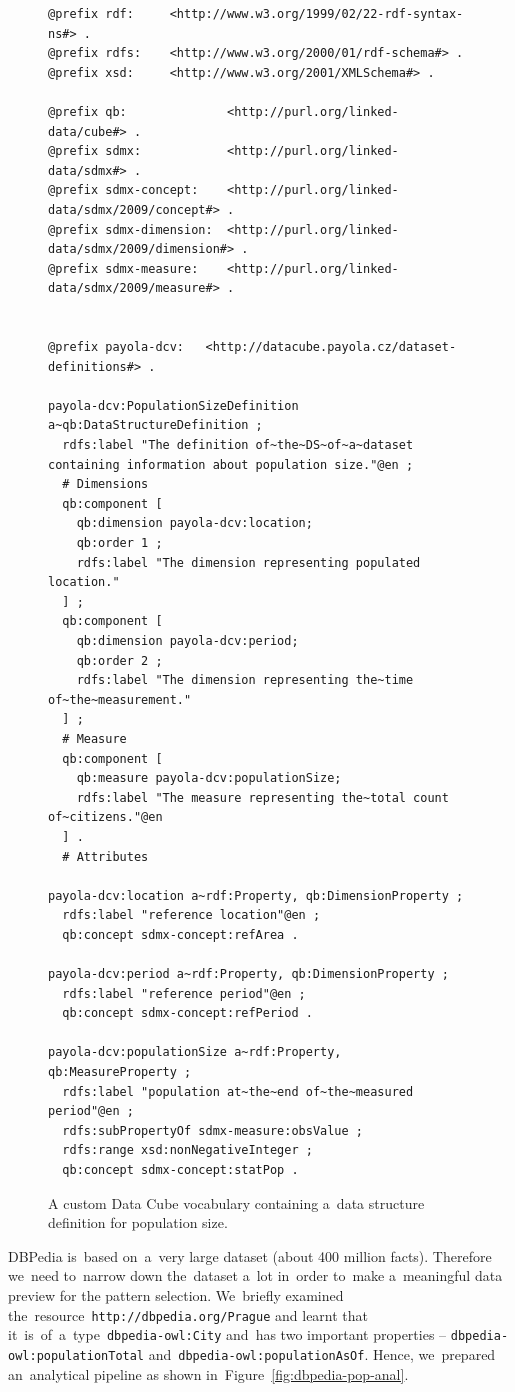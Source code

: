 \begin{figure}
  \scriptsize
  \begin{verbatim}
@prefix rdf:     <http://www.w3.org/1999/02/22-rdf-syntax-ns#> .
@prefix rdfs:    <http://www.w3.org/2000/01/rdf-schema#> .
@prefix xsd:     <http://www.w3.org/2001/XMLSchema#> .

@prefix qb:              <http://purl.org/linked-data/cube#> .
@prefix sdmx:            <http://purl.org/linked-data/sdmx#> .
@prefix sdmx-concept:    <http://purl.org/linked-data/sdmx/2009/concept#> .
@prefix sdmx-dimension:  <http://purl.org/linked-data/sdmx/2009/dimension#> .
@prefix sdmx-measure:    <http://purl.org/linked-data/sdmx/2009/measure#> .


@prefix payola-dcv:   <http://datacube.payola.cz/dataset-definitions#> .

payola-dcv:PopulationSizeDefinition a~qb:DataStructureDefinition ;
  rdfs:label "The definition of~the~DS~of~a~dataset containing information about population size."@en ;
  # Dimensions
  qb:component [
    qb:dimension payola-dcv:location;
    qb:order 1 ;
    rdfs:label "The dimension representing populated location."
  ] ;
  qb:component [	
    qb:dimension payola-dcv:period;
    qb:order 2 ;
    rdfs:label "The dimension representing the~time of~the~measurement."
  ] ;
  # Measure
  qb:component [
    qb:measure payola-dcv:populationSize;
    rdfs:label "The measure representing the~total count of~citizens."@en
  ] .
  # Attributes

payola-dcv:location a~rdf:Property, qb:DimensionProperty ;
  rdfs:label "reference location"@en ;
  qb:concept sdmx-concept:refArea .

payola-dcv:period a~rdf:Property, qb:DimensionProperty ;
  rdfs:label "reference period"@en ;
  qb:concept sdmx-concept:refPeriod .

payola-dcv:populationSize a~rdf:Property, qb:MeasureProperty ;
  rdfs:label "population at~the~end of~the~measured period"@en ;
  rdfs:subPropertyOf sdmx-measure:obsValue ;
  rdfs:range xsd:nonNegativeInteger ;
  qb:concept sdmx-concept:statPop .
  \end{verbatim}
  \caption{A custom Data Cube vocabulary containing a~data structure definition for population size.}
  \label{fig:dcv-dbpedia-dsd}
\end{figure}

\begin{sloppypar}
DBPedia is~based on~a~very large dataset (about 400 million facts). Therefore we~need to~narrow down the~dataset a~lot in~order to~make a~meaningful data preview for 
the
pattern selection. We~briefly examined the~resource~\texttt{http://dbpedia.org/Prague} 
and learnt that it~is~of~a~type~\texttt{dbpedia-owl:City} and~has two 
important properties -- \texttt{dbpedia-owl:populationTotal} and~\texttt{dbpedia-owl:populationAsOf}. Hence, we~prepared an~analytical pipeline 
as shown in~Figure~\ref{fig:dbpedia-pop-anal}.
\end{sloppypar}

